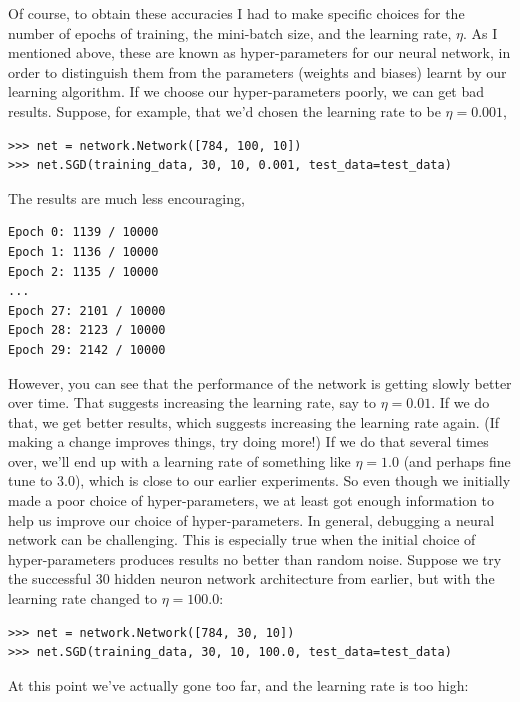\documentclass[a4paper,twoside,10pt]{book}
\begin{document}
Of course, to obtain these accuracies I had to make specific choices for the number of epochs of training, the mini-batch size, and the learning rate, $\eta$. As I mentioned above, these are known as hyper-parameters for our neural network, in order to distinguish them from the parameters (weights and biases) learnt by our learning algorithm. If we choose our hyper-parameters poorly, we can get bad results. Suppose, for example, that we'd chosen the learning rate to be $\eta=0.001$,
\begin{lstlisting}
>>> net = network.Network([784, 100, 10])
>>> net.SGD(training_data, 30, 10, 0.001, test_data=test_data)
\end{lstlisting}
The results are much less encouraging,
\begin{lstlisting}
Epoch 0: 1139 / 10000
Epoch 1: 1136 / 10000
Epoch 2: 1135 / 10000
...
Epoch 27: 2101 / 10000
Epoch 28: 2123 / 10000
Epoch 29: 2142 / 10000
\end{lstlisting}
However, you can see that the performance of the network is getting slowly better over time. That suggests increasing the learning rate, say to $\eta =0.01$. If we do that, we get better results, which suggests increasing the learning rate again. (If making a change improves things, try doing more!) If we do that several times over, we'll end up with a learning rate of something like $\eta=1.0$ (and perhaps fine tune to 3.0), which is close to our earlier experiments. So even though we initially made a poor choice of hyper-parameters, we at least got enough information to help us improve our choice of hyper-parameters.
In general, debugging a neural network can be challenging. This is especially true when the initial choice of hyper-parameters produces results no better than random noise. Suppose we try the successful 30 hidden neuron network architecture from earlier, but with the learning rate changed to $\eta=100.0$:
\begin{lstlisting}
>>> net = network.Network([784, 30, 10])
>>> net.SGD(training_data, 30, 10, 100.0, test_data=test_data)
\end{lstlisting}
At this point we've actually gone too far, and the learning rate is too high:
\end{document}
